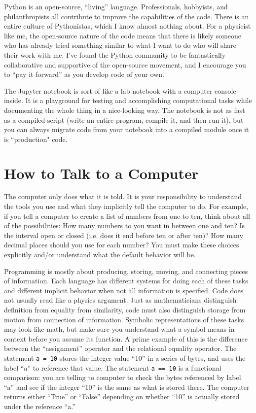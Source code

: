 \documentclass[11pt]{article}
\begin{document}
Python is an open-source, ``living'' language.  
Professionals, hobbyists, and philanthropists all contribute to improve the capabilities of the code.
There is an entire culture of Pythonistas, which I know almost nothing about.
For a physicist like me, the open-source nature of the code means that there is likely someone who has already tried something similar to what I want to do who will share their work with me.
I've found the Python community to be fantastically collaborative and supportive of the open-source movement, and I encourage you to ``pay it forward'' as you develop code of your own.

The Jupyter notebook is sort of like a lab notebook with a computer console inside.  
It is a playground for testing and accomplishing computational tasks while documenting the whole thing in a nice-looking way.  
The notebook is not as fast as a compiled script (write an entire program, compile it, and then run it), but you can always migrate code from your notebook into a compiled module once it is ``production" code.

\section{How to Talk to a Computer}

The computer only does what it is told.  
It is your responsibility to understand the tools you use and what they implicitly tell the computer to do.
For example, if you tell a computer to create a list of numbers from one to ten, think about all of the possibilities:
How many numbers to you want in between one and ten?  Is the interval open or closed (i.e. does it end before ten or after ten)?  How many decimal places should you use for each number? 
You must make these choices explicitly and/or understand what the default behavior will be.  

Programming is mostly about producing, storing, moving, and connecting pieces of information.  
Each language has different systems for doing each of these tasks and different implicit behavior when not all information is specified.  
Code does not usually read like a physics argument.  
Just as mathematicians distinguish definition from equality from similarity, code must also distinguish storage from motion from connection of information.  
Symbolic representations of these tasks may look like math, but make sure you understand what a symbol means in context before you assume its function.
A prime example of this is the difference between the ``assignment'' operator and the relational equality operator.
The statement \texttt{a = 10}
stores the integer value ``10'' in a series of bytes, and uses the label ``a'' to reference that value.
The statement \texttt{a == 10}
is a functional comparison: you are telling to computer to check the bytes referenced by label ``a'' and see if the integer ``10'' is the same as what is stored there.
The computer returns either ``True'' or ``False'' depending on whether ``10'' is actually stored under the reference ``a.''
\end{document}

